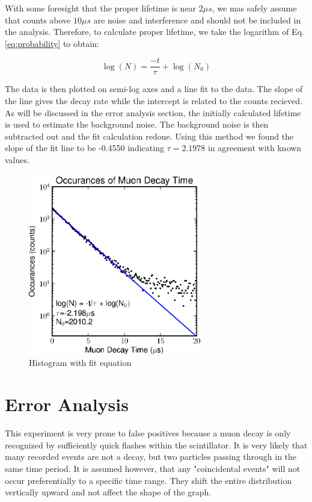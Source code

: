 \documentclass[12pt,twocolumn]{article}
\begin{document}
With some foresight that the proper lifetime is near $2\mu s$, we mas safely assume that counts above $10\mu s$ are
noise and interference and should not be included in the analysis. Therefore, to calculate proper lifetime, we take
the logarithm of Eq. \ref{eq:probability} to obtain:

 \begin{equation}
	 \label{eq:probability}
	 \log(N)=\frac{-t}{\tau} + \log(N_{0})
 \end{equation}

 The data is then plotted on semi-log axes and a line fit to the data. The slope of the line gives the decay rate while
 the intercept is related to the counts recieved. As will be discussed in the error analysis section, the initially 
 calculated lifetime is used to estimate the background noise. The background noise is then subtracted out and the fit
 calculation redone. Using this method we found the slope of the fit line to be -0.4550 indicating $\tau=2.1978$ in
 agreement with known values.

\begin{figure}[h!]
	\centering
	\label{fig:fit1}
	\includegraphics[width=3in]{images/fit1}
	\caption{Histogram with fit equation}
\end{figure}

\section{Error Analysis}

This experiment is very prone to false positives because a muon decay is only recognized by sufficiently quick
flashes within the scintillator. It is very likely that many recorded events are not a decay, but two particles
passing through in the same time period. It is assumed however, that any "coincidental events" will not occur
preferentially to a specific time range. They shift the entire distribution vertically upward and not affect the shape of
the graph.
\end{document}
